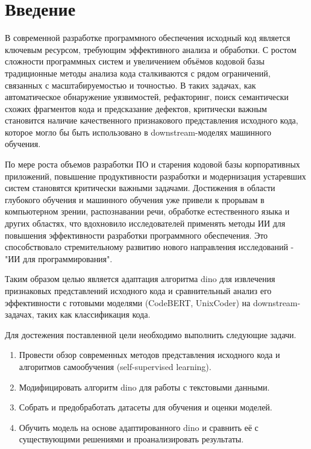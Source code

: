 \documentclass[../document.tex]{subfiles}
\begin{document}
    \section*{Введение}
    \par В современной разработке программного обеспечения исходный код является ключевым ресурсом, требующим эффективного анализа и обработки. С ростом сложности программных систем и увеличением объёмов кодовой базы традиционные методы анализа кода сталкиваются с рядом ограничений, связанных с масштабируемостью и точностью. В таких задачах, как автоматическое обнаружение уязвимостей, рефакторинг, поиск семантически схожих фрагментов кода и предсказание дефектов, критически важным становится наличие качественного признакового представления исходного кода, которое могло бы быть использовано в downstream-моделях машинного обучения.
    \par По мере роста объемов разработки ПО и старения кодовой базы корпоративных приложений, повышение продуктивности разработки и модернизация устаревших систем становятся критически важными задачами. Достижения в области глубокого обучения и машинного обучения уже привели к прорывам в компьютерном зрении, распознавании речи, обработке естественного языка и других областях, что вдохновило исследователей применять методы ИИ для повышения эффективности разработки программного обеспечения. Это способствовало стремительному развитию нового направления исследований - "ИИ для программирования". 
    \par Таким образом целью является адаптация алгоритма \gls{dino}\cite{caron2021emergingpropertiesselfsupervisedvision, oquab2024dinov2learningrobustvisual, darcet2024visiontransformersneedregisters} для извлечения признаковых представлений исходного кода и сравнительный анализ его эффективности с готовыми моделями (CodeBERT\cite{feng2020codebertpretrainedmodelprogramming}, UnixCoder\cite{guo2022unixcoder}) на downstream-задачах, таких как классификация кода.
    \par Для достежения поставленной цели необходимо выполнить следующие задачи.
    \begin{enumerate}
        \item Провести обзор современных методов представления исходного кода и алгоритмов самообучения (self-supervised learning).
        \item Модифицировать алгоритм \gls{dino} для работы с текстовыми данными.
        \item Собрать и предобработать датасеты для обучения и оценки моделей.
        \item Обучить модель на основе адаптированного \gls{dino} и сравнить её с существующими решениями и проанализировать результаты.
    \end{enumerate}
\end{document}
